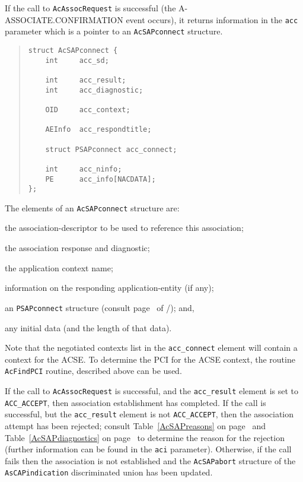 If the call to \verb"AcAssocRequest" is successful
(the {\sf A-ASSOCIATE.CON\-FIR\-MA\-TION\/} event occurs),
it returns information in the \verb"acc" parameter
which is a pointer to an \verb"AcSAPconnect" structure.
\begin{quote}\small\begin{verbatim}
struct AcSAPconnect {
    int     acc_sd;

    int     acc_result;
    int     acc_diagnostic;

    OID     acc_context;

    AEInfo  acc_respondtitle;

    struct PSAPconnect acc_connect;

    int     acc_ninfo;
    PE      acc_info[NACDATA];
};
\end{verbatim}\end{quote}
The elements of an \verb"AcSAPconnect" structure are:\label{AcSAPconnect}
\begin{describe}
\item[\verb"acc\_sd":] the association-descriptor to be used to reference
this association;

\item[\verb"acc\_result"/\verb"acc\_diagnostic":] the association response
and diagnostic;

\item[\verb"acc\_context":] the application context name;

\item[\verb"acc\_respondtitle":] information on the responding
application-entity (if any);

\item[\verb"acc\_connect":] an \verb"PSAPconnect" structure
(consult page~\pageref{PSAPconnect} of \voltwo/);
and,

\item[\verb"acc\_info"/\verb"acc\_ninfo":] any initial data
(and the length of that data).
\end{describe}
Note that the negotiated contexts list in the \verb"acc_connect" element
will contain a context for the ACSE.
To determine the PCI for the ACSE context,
the routine \verb"AcFindPCI" routine,
described above can be used.

If the call to \verb"AcAssocRequest" is successful,
and the \verb"acc_result" element is set to \verb"ACC_ACCEPT",
then association establishment has completed.
If the call is successful,
but the \verb"acc_result" element is not \verb"ACC_ACCEPT",
then the association attempt has been rejected;
consult Table~\ref{AcSAPreasons} on page~\pageref{AcSAPreasons} 
and Table~\ref{AcSAPdiagnostics} on page~\pageref{AcSAPdiagnostics} 
to determine the reason for the rejection
(further information can be found in the \verb"aci" parameter).
Otherwise, if the call fails then the association is not established and
the \verb"AcSAPabort" structure of the \verb"AsCAPindication" discriminated
union has been updated.

